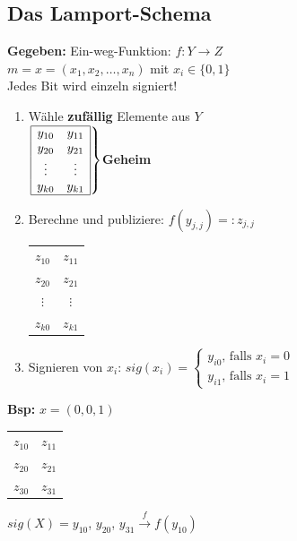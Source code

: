 \documentclass[10pt]{article}
\newcommand{\Bold}[1]{\textbf{#1}} %
\newcommand{\T}[1]{\text{#1}} %
\newcommand{\Brackal}[2]{\left\lbrace\begin{array}{#1} #2 \end{array}\right.} %
\newcommand{\Brackar}[2]{\left.\begin{array}{#1} #2 \end{array}\right\rbrace} %
\newcommand{\Oben}[2]{\overset{#1}{#2}} %
\begin{document}
\subsection{Das Lamport-Schema}
 \Bold{Gegeben:} Ein-weg-Funktion: $f:Y\to Z$\\
 $m=x=(x_1,x_2,\dots,x_n)$ mit $x_i\in\{0,1\}$\\
 Jedes Bit wird einzeln signiert!
 \begin{enumerate}
  \item Wähle \Bold{zufällig} Elemente aus $Y$\\
  $\Brackar{|cc|}{\hline
   y_{10}&y_{11}\\
   y_{20}&y_{21}\\
   \vdots&\vdots\\
   y_{k0}&y_{k1}\\\hline
  }$\Bold{Geheim}
  \item Berechne und publiziere: $f(y_{j,j})=:z_{j,j}$\\
  \begin{tabular}{|cc|}\hline
   $z_{10}$&$z_{11}$\\
   $z_{20}$&$z_{21}$\\
   $\vdots$&$\vdots$\\
   $z_{k0}$&$z_{k1}$\\\hline
  \end{tabular}
  \item Signieren von $x_i$: $sig(x_i)=\Brackal{c}{y_{i0}\T{, falls }x_i=0\\y_{i1}\T{, falls }x_i=1}$
 \end{enumerate}
 \Bold{Bsp:} $x=(0,0,1)$
   \begin{tabular}{|cc|}\hline
   $z_{10}$&$z_{11}$\\
   $z_{20}$&$z_{21}$\\
   $z_{30}$&$z_{31}$\\\hline
  \end{tabular}
  $sig(X)=y_{10}$, $y_{20}$, $y_{31}\Oben{f}{\to}f(y_{10})$
\end{document}

